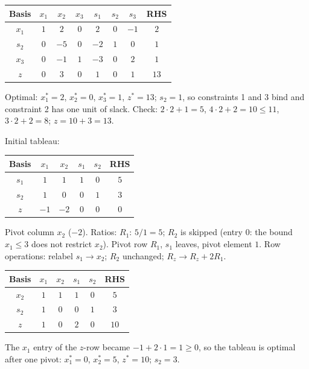 \begin{solutions}
\begin{center}
\begin{tabular}{c|cccccc|c}
        Basis & $x_1$ & $x_2$ & $x_3$ & $s_1$ & $s_2$ & $s_3$ & RHS\\
        \hline
        $x_1$ & $1$ & $2$ & $0$ & $2$ & $0$ & $-1$ & $2$\\
        $s_2$ & $0$ & $-5$ & $0$ & $-2$ & $1$ & $0$ & $1$\\
        $x_3$ & $0$ & $-1$ & $1$ & $-3$ & $0$ & $2$ & $1$\\
        \hline
        $z$ & $0$ & $3$ & $0$ & $1$ & $0$ & $1$ & $13$\\
        \end{tabular}
        \end{center}
        Optimal: $x_1^{*}=2$, $x_2^{*}=0$, $x_3^{*}=1$, $z^{*}=13$;
        $s_2=1$, so constraints 1 and 3 bind and constraint 2 has one
        unit of slack. Check: $2\cdot 2+1=5$, $4\cdot 2+2=10\le 11$,
        $3\cdot 2+2=8$; $z=10+3=13$.

  \item Initial tableau:
        \begin{center}
        \begin{tabular}{c|cccc|c}
        Basis & $x_1$ & $x_2$ & $s_1$ & $s_2$ & RHS\\
        \hline
        $s_1$ & $1$ & $1$ & $1$ & $0$ & $5$\\
        $s_2$ & $1$ & $0$ & $0$ & $1$ & $3$\\
        \hline
        $z$ & $-1$ & $-2$ & $0$ & $0$ & $0$\\
        \end{tabular}
        \end{center}
        Pivot column $x_2$ ($-2$). Ratios: $R_1$: $5/1=5$; $R_2$ is
        skipped (entry $0$: the bound $x_1\le 3$ does not restrict
        $x_2$). Pivot row $R_1$, $s_1$ leaves, pivot element $1$. Row
        operations: relabel $s_1\to x_2$; $R_2$ unchanged;
        $R_z\to R_z+2R_1$.
        \begin{center}
        \begin{tabular}{c|cccc|c}
        Basis & $x_1$ & $x_2$ & $s_1$ & $s_2$ & RHS\\
        \hline
        $x_2$ & $1$ & $1$ & $1$ & $0$ & $5$\\
        $s_2$ & $1$ & $0$ & $0$ & $1$ & $3$\\
        \hline
        $z$ & $1$ & $0$ & $2$ & $0$ & $10$\\
        \end{tabular}
        \end{center}
        The $x_1$ entry of the $z$-row became $-1+2\cdot 1=1\ge 0$, so
        the tableau is optimal after one pivot: $x_1^{*}=0$,
        $x_2^{*}=5$, $z^{*}=10$; $s_2=3$.


\end{solutions}
